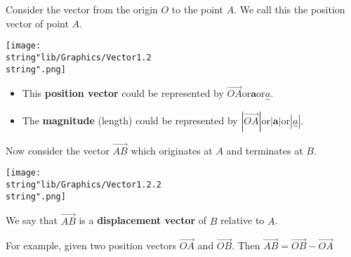 \documentclass[11pt,a4paper]{book}
\begin{document}
Consider the vector from the origin $O$ to the point $A$. We call
this the position vector of point $A$.

\medskip

\begin{minipage}[t]{0.4\textwidth}
\begin{center}
\texttt{[image: \\string"lib/Graphics/Vector1.2\\string".png]}
\par\end{center}

\end{minipage}
\begin{minipage}[t]{0.6\textwidth}

\begin{tcolorbox}[colback=blue!5, colframe=black, boxrule=.4pt, sharpish corners]

\begin{itemize}
\item This \textbf{position vector} could be represented by $\overrightarrow{OA}$\hspace{0.5cm}or\hspace{0.5cm}$\textbf{a}$\hspace{0.5cm}or\hspace{0.5cm}$\underset{\sim}{a}$.
\item The \textbf{magnitude} (length) could be represented by $\left|\overrightarrow{OA}\right|$\hspace{0.5cm}or\hspace{0.5cm}$\left|\textbf{a}\right|$\hspace{0.5cm}or\hspace{0.5cm}$\left|\underset{\sim}{a}\right|$.
\end{itemize}
\end{tcolorbox}

\end{minipage}

Now consider the vector $\overrightarrow{AB}$ which originates at
$A$ and terminates at $B$.

\medskip

\begin{minipage}[t]{0.35\textwidth}
\begin{center}
\texttt{[image: \\string"lib/Graphics/Vector1.2.2\\string".png]}
\par\end{center}

\end{minipage}
\begin{minipage}[t]{0.62\textwidth}

\begin{tcolorbox}[colback=blue!5, colframe=black, boxrule=.4pt, sharpish corners]

We say that $\overrightarrow{AB}$ is a \textbf{displacement vector
}of $B$ relative to $A$.

\medskip{}

For example, given two position vectors $\overrightarrow{OA}$ and
$\overrightarrow{OB}$. Then $\overrightarrow{AB}=\overrightarrow{OB}-\overrightarrow{OA}$
\end{tcolorbox}

\end{minipage}
\end{document}
